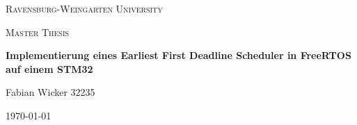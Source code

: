 \documentclass[../EDF Master Thesis.tex]{subfiles}
\begin{document}
    \centering
    {\scshape\LARGE Ravensburg-Weingarten University\par}
    \vspace{1.5cm}
    \begin{figure}[hb]
        \centering
        \rwulogo[width=0.4\columnwidth]
    \end{figure}
    \vspace{5cm}
    {\scshape\Large Master Thesis\par}
    \vspace{0.25cm}
    {\huge\bfseries Implementierung eines Earliest First Deadline Scheduler in FreeRTOS auf einem STM32\par}
    \vspace{4cm}
    {\Large Fabian Wicker 32235\par}
    \vfill
    {\large \today\par}
\end{document}
